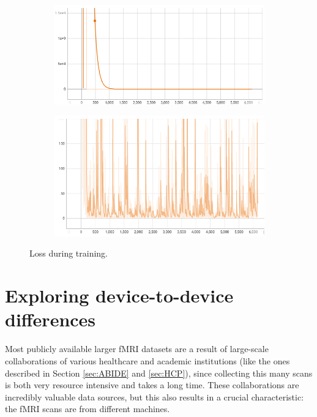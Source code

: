 		\begin{figure}[!h]
		\centering
		\begin{subfigure}[b]{0.45\textwidth}
			\centering
			\includegraphics[width=\textwidth]{figures/train-loss.png}
		\end{subfigure}
		\hfill
		\begin{subfigure}[b]{0.45\textwidth}
			\centering
			\includegraphics[width=\textwidth]{figures/step-loss.png}
		\end{subfigure}
		\caption{Loss during training.}
		\label{fig:loss}
	\end{figure}
	
\pagebreak

\section{Exploring device-to-device differences}

	Most publicly available larger fMRI datasets are a result of large-scale collaborations of various healthcare and academic institutions (like the ones described in Section \ref{sec:ABIDE} and \ref{sec:HCP}), since collecting this many scans is both very resource intensive and takes a long time. These collaborations are incredibly valuable data sources, but this also results in a crucial characteristic: the fMRI scans are from different machines.
	
